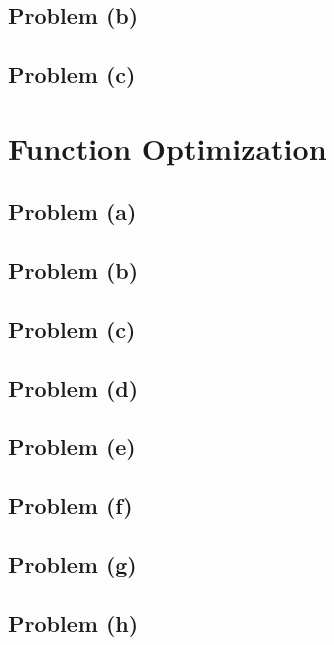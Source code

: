 \documentclass[11pt]{article}
\newcommand{\newsection}[1]{\newpage\section*{#1}}
\newcommand{\newproblem}[1]{\newpage\subsection*{#1}}
\newcommand{\includeCode}[1]{\VerbatimInput[fontsize=\small,fontshape=rm]{#1}}
\begin{document}
\newproblem{Problem (b)}


\newproblem{Problem (c)}


\newsection{Function Optimization}

\subsection*{Problem (a)}


\newproblem{Problem (b)}

\newproblem{Problem (c)}


\newproblem{Problem (d)}

\newproblem{Problem (e)}

\newproblem{Problem (f)}

\newproblem{Problem (g)}

\newproblem{Problem (h)}
\end{document}
